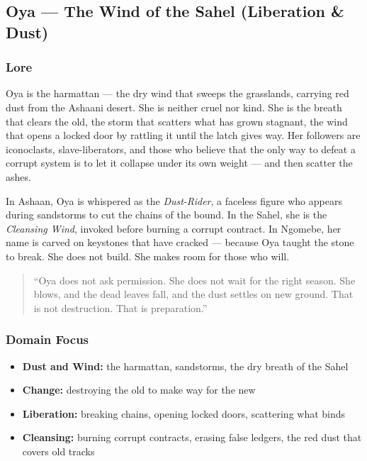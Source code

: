 
\subsection{Oya --- The Wind of the Sahel (Liberation \& Dust)}

\subsubsection*{Lore}
Oya is the harmattan --- the dry wind that sweeps the grasslands, carrying red dust from the Ashaani desert. She is neither cruel nor kind. She is the breath that clears the old, the storm that scatters what has grown stagnant, the wind that opens a locked door by rattling it until the latch gives way. Her followers are iconoclasts, slave-liberators, and those who believe that the only way to defeat a corrupt system is to let it collapse under its own weight --- and then scatter the ashes.

In Ashaan, Oya is whispered as the \textit{Dust-Rider}, a faceless figure who appears during sandstorms to cut the chains of the bound. In the Sahel, she is the \textit{Cleansing Wind}, invoked before burning a corrupt contract. In Ngomebe, her name is carved on keystones that have cracked --- because Oya taught the stone to break. She does not build. She makes room for those who will.

\begin{quote}
``Oya does not ask permission. She does not wait for the right season. She blows, and the dead leaves fall, and the dust settles on new ground. That is not destruction. That is preparation.''
\end{quote}

\subsubsection*{Domain Focus}
\begin{itemize}
  \item \textbf{Dust and Wind:} the harmattan, sandstorms, the dry breath of the Sahel
  \item \textbf{Change:} destroying the old to make way for the new
  \item \textbf{Liberation:} breaking chains, opening locked doors, scattering what binds
  \item \textbf{Cleansing:} burning corrupt contracts, erasing false ledgers, the red dust that covers old tracks
\end{itemize}


